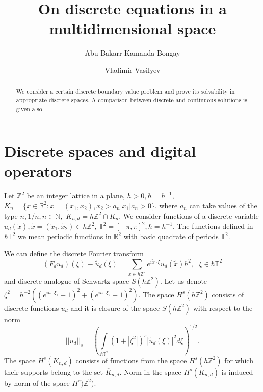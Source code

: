 \documentclass[12pt]{llncs}
\begin{document}
\fi

%
\title{On discrete equations in a multidimensional space}%
\author{Abu Bakarr Kamanda Bongay   \and  Vladimir Vasilyev
}

\maketitle

\begin{abstract}
We consider a certain discrete boundary value problem and prove its solvability in appropriate discrete spaces. A comparison between discrete and continuous solutions is given also.

\end{abstract}

\section{Discrete spaces and digital operators}



Let $\mathbb Z^2$ be an integer lattice in a plane, $h>0, \hbar=h^{-1},$ $K_n=\{x\in\mathbb R^2: x=(x_1,x_2), x_2>a_n|x_1|a_n>0\}$, where $a_n$ can take values of the type $n, 1/n, n\in\mathbb N,$ $K_{n,d}=h\mathbb Z^2\cap K_n$. We consider functions of a discrete variable $u_d(\tilde x), \tilde x=(\tilde x_1,\tilde x_2)\in h\mathbb Z^2$, $\mathbb T^2=[-\pi,\pi]^2, \hbar=h^{-1}$. The functions defined in $\hbar\mathbb T^2$ we mean periodic functions in $\mathbb R^2$ with basic quadrate of periods $\mathbb T^2$.

We can define the discrete Fourier transform
\[
(F_du_d)(\xi)\equiv\tilde u_d(\xi)=\sum\limits_{\tilde x\in h\mathbb Z^2}e^{i\tilde x\cdot\xi}u_d(\tilde x)h^2,~~~\xi\in\hbar\mathbb T^2
\]
and discrete analogue of Schwartz space  $S(h\mathbb Z^2)$.
Let us denote $\zeta^2=h^{-2}((e^{ih\cdot\xi_1}-1)^2+(e^{ih\cdot\xi_2}-1)^2)$.
The space  $H^s(h\mathbb Z^2)$ consists of discrete functions $u_d$ and it is closure of the space  $S(h\mathbb Z^2)$ with respect to the norm
	\[
	||u_d||_s=\left(\int\limits_{\hbar\mathbb T^2}(1+|\zeta^2|)^s|\tilde u_d(\xi)|^2d\xi\right)^{1/2}.
	\]
The space $H^s(K_{n,d})$ consists of functions \cite{VV} from the space  $H^s(h\mathbb Z^2)$ for which their supports belong to the set  $\overline{K}_{n,d}$. Norm in the space  $H^s(K_{n,d})$ is induced by norm of the space $H^s)\mathbb Z^2)$.
\end{document}
